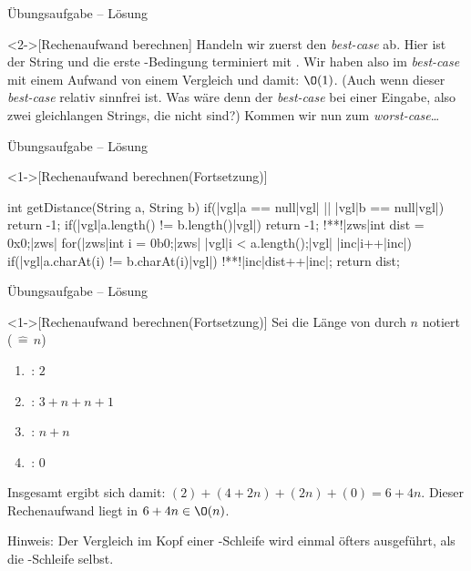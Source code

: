 \begin{frame}[c]{Übungsaufgabe -- Lösung}
    \begin{solve}<2->[Rechenaufwand berechnen]
    \pause{}Handeln wir zuerst den \emph{best-case} ab.\pause{} Hier ist der String   und die erste -Bedingung terminiert mit .\pause{} Wir haben also im \emph{best-case} mit einem Aufwand von einem Vergleich und damit: \(\O(1)\).\pause{} (Auch wenn dieser \emph{best-case} relativ sinnfrei ist.\pause{} Was wäre denn der \emph{best-case} bei einer  Eingabe\pause{}, also zwei gleichlangen Strings, die nicht  sind?)\pause{} Kommen wir nun zum \emph{worst-case}\ldots
    \end{solve}
\end{frame}

\begin{frame}[fragile,c]{Übungsaufgabe -- Lösung}
    \addtocounter{solve}{-1}%
    \begin{solve}<1->[Rechenaufwand berechnen\hfill{}(Fortsetzung)]
\begin{plainjava}[language=xJava]
int getDistance(String a, String b){
    if(|vgl|a == null|vgl| || |vgl|b == null|vgl|) return -1;
    if(|vgl|a.length() != b.length()|vgl|) return -1;
    !**!|zws|int dist = 0x0;|zws|
    for(|zws|int i = 0b0;|zws| |vgl|i < a.length();|vgl| |inc|i++|inc|)
        if(|vgl|a.charAt(i) != b.charAt(i)|vgl|)
            !**!|inc|dist++|inc|;
    return dist;
}
\end{plainjava}
    \end{solve}
\end{frame}


\begin{frame}[c]{Übungsaufgabe -- Lösung}
    \addtocounter{solve}{-1}%
    \begin{solve}<1->[Rechenaufwand berechnen\hfill{}(Fortsetzung)]
        \pause{}Sei die Länge von  durch \(n\) notiert (\(\,\widehat{=}\, n\))
\begin{multicols}{2}
    \begin{enumerate}[<+(1)->]
        \item {}\,: \(2\)
        \item {}\,: \(3 + n + n + 1\)
        \item {}\,: \(n+n\)
        \item {}\,: \(0\)
    \end{enumerate}
\end{multicols}
    \pause{}Insgesamt ergibt sich damit: \((2) + (4 + 2n) + (2n) + (0) = 6 + 4n\).\pause{} Dieser Rechenaufwand liegt in \(6 + 4n \in \O(n)\).\smallskip\par\pause{}Hinweis: Der Vergleich im Kopf einer -Schleife wird einmal öfters ausgeführt,\pause{} als die -Schleife selbst.
    \end{solve}
\end{frame}

